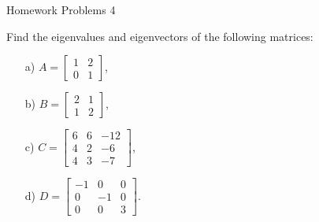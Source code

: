  \begin{center}\begin{large} Homework Problems 4
 \end{large}\end{center}
 \bigskip


\begin{problem}%
    Find the eigenvalues and eigenvectors of the following matrices:

    \begin{enumerate}
        \item[a) ] $A=\begin{bmatrix}
            1&2\\0&1\end{bmatrix}$,

        \item[b) ] $B=\begin{bmatrix}
            2&1\\1&2
        \end{bmatrix}$,
        
        \item[c) ] $C=\begin{bmatrix}
            6&6&-12\\4&2&-6\\4&3&-7
        \end{bmatrix}$,
        
        \item[d) ] $D=\begin{bmatrix}
-1&0&0\\0&-1&0\\0&0&3        \end{bmatrix}$.
    \end{enumerate}

\end{problem}




